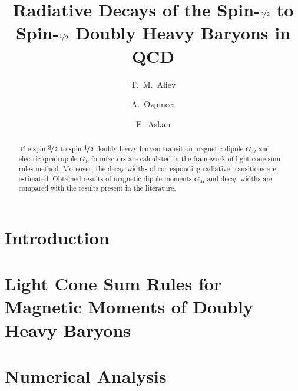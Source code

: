 \documentclass[11pt,aps,prd,showpacs,showkeys,superscriptaddress,preprintnumbers,amsmath,amssymb,nofootinbib]{revtex4-1}
\begin{document}
\title{Radiative Decays of the Spin-$\nicefrac{3}{2}$ to Spin-$\nicefrac{1}{2}$ Doubly Heavy Baryons in QCD}



\author{T.~M.~Aliev}
%
\author{A.~Ozpineci}
%
\author{E.~Askan}

\allowdisplaybreaks[2]



\begin{abstract}
%
    \vspace{1cm}
    The spin-$\nicefrac{3}{2}$ to spin-$\nicefrac{1}{2}$ doubly heavy baryon transition magnetic dipole $G_M$ and electric quadrupole $G_E$ formfactors are calculated in the framework of light cone sum rules method. Moreover, the decay widths of corresponding radiative transitions are estimated. Obtained results of magnetic dipole moments $G_M$ and decay widths are compared with the results present in the literature.

\end{abstract}




\maketitle







\tikzexternaldisable
\section{Introduction}

%
\section{Light Cone Sum Rules for Magnetic Moments of Doubly Heavy Baryons}


\section{Numerical Analysis}

%
%
\newpage

\tikzexternaldisable

%

\newpage

\appendices

\end{document}
